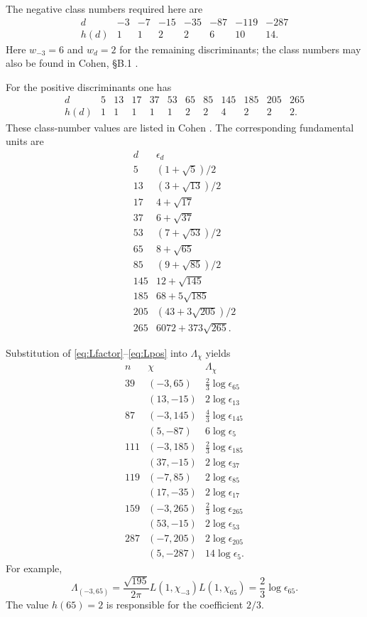 \documentclass[11pt,a4paper]{article}
\begin{document}
The negative class numbers required here are
\[
\begin{array}{c|rrrrrrr}
d&-3&-7&-15&-35&-87&-119&-287\\ \hline
h(d)&1&1&2&2&6&10&14.
\end{array}
\]
Here $w_{-3}=6$ and $w_d=2$ for the remaining discriminants; the class numbers may also be found in Cohen, \S B.1 \cite{Cohen1993}.

For the positive discriminants one has
\[
\begin{array}{c|rrrrrrrrrrr}
d&5&13&17&37&53&65&85&145&185&205&265\\ \hline
h(d)&1&1&1&1&1&2&2&4&2&2&2.
\end{array}
\]
These class-number values are listed in Cohen \cite{Cohen1993}.  The corresponding fundamental units are
\[
\begin{array}{c|c}
d&\epsilon_d\\ \hline
5&(1+\sqrt5)/2\\
13&(3+\sqrt{13})/2\\
17&4+\sqrt{17}\\
37&6+\sqrt{37}\\
53&(7+\sqrt{53})/2\\
65&8+\sqrt{65}\\
85&(9+\sqrt{85})/2\\
145&12+\sqrt{145}\\
185&68+5\sqrt{185}\\
205&(43+3\sqrt{205})/2\\
265&6072+373\sqrt{265}.
\end{array}
\]

Substitution of \eqref{eq:Lfactor}--\eqref{eq:Lpos} into $\Lambda_\chi$ yields
\[
\begin{array}{c|c|c}
 n&\chi&\Lambda_\chi\\ \hline
39&(-3,65)&\frac23\log\epsilon_{65}\\
 &(13,-15)&2\log\epsilon_{13}\\[1mm]
87&(-3,145)&\frac43\log\epsilon_{145}\\
 &(5,-87)&6\log\epsilon_5\\[1mm]
111&(-3,185)&\frac23\log\epsilon_{185}\\
 &(37,-15)&2\log\epsilon_{37}\\[1mm]
119&(-7,85)&2\log\epsilon_{85}\\
 &(17,-35)&2\log\epsilon_{17}\\[1mm]
159&(-3,265)&\frac23\log\epsilon_{265}\\
 &(53,-15)&2\log\epsilon_{53}\\[1mm]
287&(-7,205)&2\log\epsilon_{205}\\
 &(5,-287)&14\log\epsilon_5.
\end{array}
\]
For example,
\[
\Lambda_{(-3,65)}
=\frac{\sqrt{195}}{2\pi}L(1,\chi_{-3})L(1,\chi_{65})
=\frac23\log\epsilon_{65}.
\]
The value $h(65)=2$ is responsible for the coefficient $2/3$.
\end{document}
